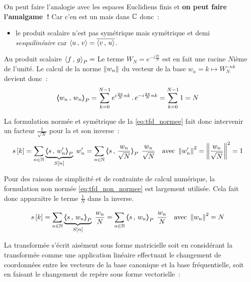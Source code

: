 

On peut faire l'analogie avec les espaces Euclidiens finis et
\textbf{on peut faire l'amalgame~!} Car c'en est un mais dans $\mathbb{C}$
donc~:
\begin{itemize}
\item le produit scalaire n'est pas symétrique mais \og{}symétrique et
  demi\fg{} \cad \emph{sesquilinéaire} car
  $\langle u\,,\,v\rangle=\overline{\langle v\,,\,u\rangle}$.
\end{itemize}

\begin{remarque}
  Au produit scalaire $\langle f\,,\,g{\rangle}_P=$ Le terme
  $W_N= e^{-i \frac{2 \pi}{N}}$ est en fait une racine $N$ième de
  l'unité. Le calcul de la norme $\left\|w_n\right\|$ du vecteur de la base
  $w_n=k\mapsto W_N^{-nk}$ devient
  donc~:
  $$\langle\!\!\langle w_n\,,\,w_n{\rangle\!\!\rangle}_P=\sum\limits_{k=0}^{N-1}{e^{i \frac{2
        \pi}{N}nk}\,.\,e^{-i \frac{2 \pi}{N}nk}}
  =\sum\limits_{k=0}^{N-1}{1}=N $$

  La formulation normée et symétrique de la \TFD{}
  \eqref{eq:tfd_normee} fait donc intervenir un facteur
  $\frac{1}{\sqrt{N}}$ pour la \TFD{} et son inverse~:
  \begin{eqnarray}
    \label{eq:tfd_normee}
    s\b{k} = \somme{n\in\N}{}{\caCest{\scaldp{s}{w_n'}}{S\b{n}}\; w_n'} &= \somme{n\in\N}{}{\scaldp{s}{\frac{w_n}{\sqrt{N}}}}\;\, \frac{w_n}{\sqrt{N}} &\text{avec } \norme{w_n'}^2=\norme{\frac{w_n}{\sqrt{N}}}^2=1
  \end{eqnarray}
  
  Pour des raisons de simplicité et de contrainte de calcul numérique,
  la formulation non normée \eqref{eq:tfd_non_normee} est largement
  utilisée. Cela fait donc apparaitre le terme $\frac{1}{N}$ dans la
  \TFD{} inverse.

  \begin{eqnarray}
    \label{eq:tfd_non_normee}
    s\b{k} = \somme{n\in\N}{}{\caCest{\scaldp{s}{w_n}}{S\b{n}}\;\frac{w_n}{N}} &= \somme{n\in\N}{}{\scaldp{s}{w_n}}\;\, \frac{w_n}{N}&\text{avec } \norme{w_n}^2=N
  \end{eqnarray}
\end{remarque}

La transformée s'écrit aisément sous forme matricielle soit en
considérant la transformée comme une application linéaire effectuant
le changement de coordonnées entre les vecteurs de la base canonique et
la base fréquentielle, soit en faisant le changement de repère sous
forme vectorielle~:

